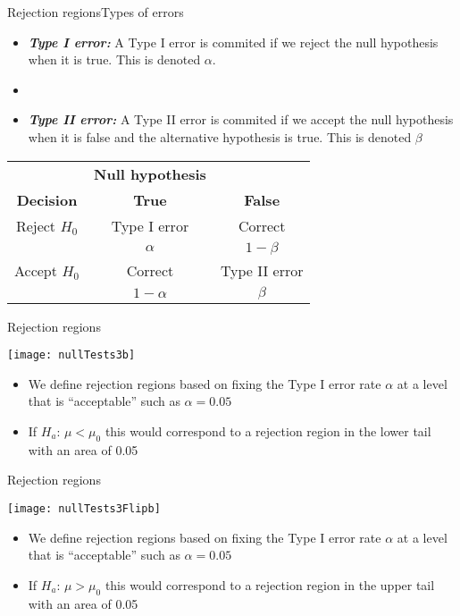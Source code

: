 \documentclass[xcolor=dvipsnames]{beamer}
\begin{document}
\begin{frame}{Rejection regions}{Types of errors}
	\begin{itemize}
		\item \textbf{\emph{Type I error:}} A Type I error is commited if we reject the null hypothesis when it is true. This is denoted $\alpha$.
		\item[]
		\item \textbf{\emph{Type II error:}} A Type II error is commited if we accept the null hypothesis when it is false and the alternative hypothesis is true. This is denoted $\beta$
	\end{itemize}
\begin{center}
	\begin{tabular}{c|cc}
		& \textbf{Null hypothesis} & \\
		\textbf{Decision} & \textbf{True} & \textbf{False} \\ \hline
		Reject $H_0$ & Type I error & Correct \\
		& $\alpha$ & $1-\beta$ \\ \hline
		Accept $H_0$ & Correct & Type II error \\
		& $1-\alpha$ & $\beta$ \\ \hline
	\end{tabular}
\end{center}
\end{frame}

\begin{frame}{Rejection regions}
	\begin{center}
				\texttt{[image: nullTests3b]}
	\end{center}
\begin{itemize}
	\item We define rejection regions based on fixing the Type I error rate $\alpha$ at a level that is ``acceptable'' such as $\alpha = 0.05$ 
	\item If $H_a$: $\mu < \mu_0$ this would correspond to a rejection region in the lower tail with an area of 0.05
\end{itemize}
\end{frame}

\begin{frame}{Rejection regions}
	\begin{center}
		\texttt{[image: nullTests3Flipb]}
	\end{center}
	\begin{itemize}
		\item We define rejection regions based on fixing the Type I error rate $\alpha$ at a level that is ``acceptable'' such as $\alpha = 0.05$ 
		\item If $H_a$: $\mu > \mu_0$ this would correspond to a rejection region in the upper tail with an area of 0.05
	\end{itemize}
\end{frame}
\end{document}
